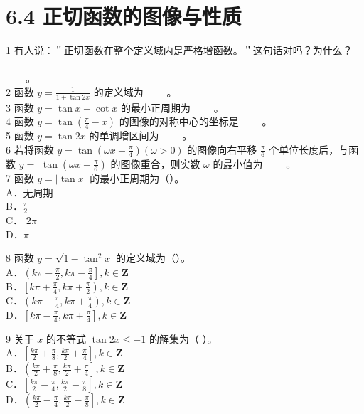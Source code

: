 \documentclass[10pt]{article}
\begin{document}
\section*{6.4 正切函数的图像与性质}
1 有人说：＂正切函数在整个定义域内是严格增函数。＂这句话对吗？为什么？ \(\qquad\)\\
\(\qquad\)。\\
2 函数 \(y=\frac{1}{1+\tan 2 x}\) 的定义域为 \(\qquad\)。\\
3 函数 \(y=\tan x-\cot x\) 的最小正周期为 \(\qquad\)。\\
4 函数 \(y=\tan \left(\frac{\pi}{4}-x\right)\) 的图像的对称中心的坐标是 \(\qquad\)。\\
5 函数 \(y=\tan 2 x\) 的单调增区间为 \(\qquad\)。\\
6 若将函数 \(y=\tan \left(\omega x+\frac{\pi}{4}\right)(\omega>0)\) 的图像向右平移 \(\frac{\pi}{6}\) 个单位长度后，与函数 \(y=\) \(\tan \left(\omega x+\frac{\pi}{6}\right)\) 的图像重合，则实数 \(\omega\) 的最小值为 \(\qquad\)。\\
7 函数 \(y=|\tan x|\) 的最小正周期为（）。\\
A．无周期\\
B．\(\frac{\pi}{2}\)\\
C． \(2 \pi\)\\
D．\(\pi\)

8 函数 \(y=\sqrt{1-\tan ^{2} x}\) 的定义域为（）。\\
A．\(\left(k \pi-\frac{\pi}{2}, k \pi-\frac{\pi}{4}\right], k \in \mathbf{Z}\)\\
B．\(\left[k \pi+\frac{\pi}{4}, k \pi+\frac{\pi}{2}\right), k \in \mathbf{Z}\)\\
C．\(\left(k \pi-\frac{\pi}{4}, k \pi+\frac{\pi}{4}\right), k \in \mathbf{Z}\)\\
D．\(\left[k \pi-\frac{\pi}{4}, k \pi+\frac{\pi}{4}\right], k \in \mathbf{Z}\)

9 关于 \(x\) 的不等式 \(\tan 2 x \leqslant-1\) 的解集为（ ）。\\
A．\(\left[\frac{k \pi}{2}+\frac{\pi}{8}, \frac{k \pi}{2}+\frac{\pi}{4}\right], k \in \mathbf{Z}\)\\
B．\(\left(\frac{k \pi}{2}+\frac{\pi}{8}, \frac{k \pi}{2}+\frac{\pi}{4}\right], k \in \mathbf{Z}\)\\
C．\(\left[\frac{k \pi}{2}-\frac{\pi}{4}, \frac{k \pi}{2}-\frac{\pi}{8}\right], k \in \mathbf{Z}\)\\
D．\(\left(\frac{k \pi}{2}-\frac{\pi}{4}, \frac{k \pi}{2}-\frac{\pi}{8}\right], k \in \mathbf{Z}\)
\end{document}
